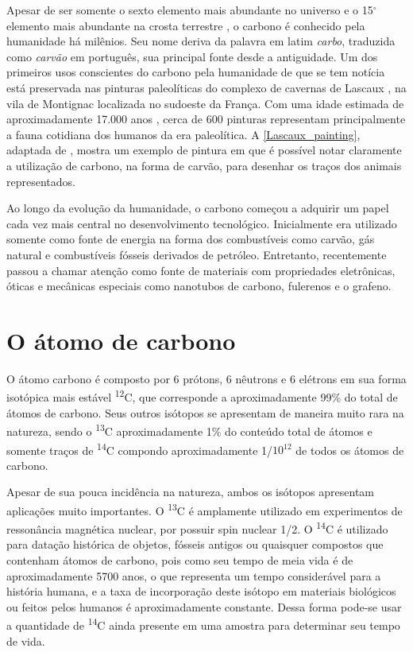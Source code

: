 	Apesar de ser somente o sexto elemento mais abundante no universo \cite{heiserman1991exploring} e o 15$^\circ$ elemento mais abundante na crosta terrestre \cite{morgan1980chemical}, o carbono é conhecido pela humanidade há milênios. Seu nome deriva da palavra em latim \textit{carbo}, traduzida como \textit{carvão} em português, sua principal fonte desde a antiguidade. Um dos primeiros usos conscientes do carbono pela humanidade de que se tem notícia está preservada nas pinturas paleolíticas do complexo de cavernas de Lascaux \cite{leroi1982archaeology}, na vila de Montignac localizada no sudoeste da França. Com uma idade estimada de aproximadamente 17.000 anos \cite{leroi1979datations}, cerca de 600 pinturas representam principalmente a fauna cotidiana dos humanos da era paleolítica. A \autoref{Lascaux_painting}, adaptada de \cite{lascaux}, mostra um exemplo de pintura em que é possível notar claramente a utilização de carbono, na forma de carvão, para desenhar os traços dos animais representados. 
	
	Ao longo da evolução da humanidade, o carbono começou a adquirir um papel cada vez mais central no desenvolvimento tecnológico. Inicialmente era utilizado somente como fonte de energia na forma dos combustíveis como carvão, gás natural e combustíveis fósseis derivados de petróleo. Entretanto, recentemente passou a chamar atenção como fonte de materiais com propriedades eletrônicas, óticas e mecânicas especiais como nanotubos de carbono, fulerenos e o grafeno. 
	
	\section{O átomo de carbono}   
	
	O átomo carbono é composto por 6 prótons, 6 nêutrons e 6 elétrons em sua forma isotópica mais estável \textsuperscript{12}C, que corresponde a aproximadamente 99\% do total de átomos de carbono. Seus outros isótopos se apresentam de maneira muito rara na natureza, sendo o \textsuperscript{13}C aproximadamente 1\% do conteúdo total de átomos e somente traços de \textsuperscript{14}C compondo aproximadamente 1/$10^{12}$ de todos os átomos de carbono. 
	
	Apesar de sua pouca incidência na natureza, ambos os isótopos apresentam aplicações muito importantes. O \textsuperscript{13}C é amplamente utilizado em experimentos de ressonância magnética nuclear, por possuir spin nuclear 1/2. O \textsuperscript{14}C é utilizado para datação histórica de objetos, fósseis antigos ou quaisquer compostos que contenham átomos de carbono, pois como seu tempo de meia vida é de aproximadamente 5700 anos, o que representa um tempo considerável para a história humana, e a taxa de incorporação deste isótopo em materiais biológicos ou feitos pelos humanos é aproximadamente constante. Dessa forma pode-se usar a quantidade de \textsuperscript{14}C ainda presente em uma amostra para determinar seu tempo de vida. 
	
